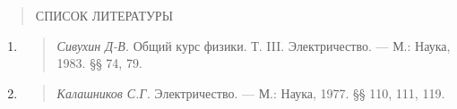 \documentclass[]{article}
\begin{document}
\begin{quote}
СПИСОК ЛИТЕРАТУРЫ
\end{quote}

\begin{enumerate}
\def\labelenumi{\arabic{enumi}.}
\item
  \begin{quote}
  \emph{Сивухин Д-В.} Общий курс физики. Т. III. Электричество. --- М.:
  Наука,\\
  1983. §§ 74, 79.
  \end{quote}
\item
  \begin{quote}
  \emph{Калашников С.Г.} Электричество. --- М.: Наука, 1977. §§ 110,
  111, 119.
  \end{quote}
\end{enumerate}
\end{document}
